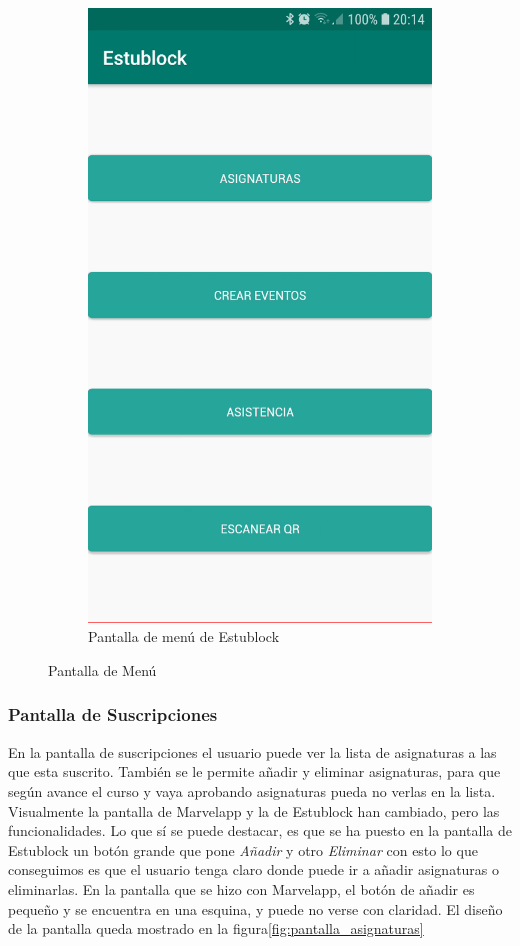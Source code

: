 \begin{figure}[hbt]
\begin{subfigure}[b]{0.4\linewidth}
        \includegraphics[width=0.7\linewidth]{figs/Desarrollo/Interfaz/estublock_menu}
        \caption[Estublock Menú]{Pantalla de menú de Estublock}
	\end{subfigure} 
	\caption[Pantalla de Menú]{Pantalla de Menú}
	\label{fig:pantalla_menu}
\end{figure}

\subsubsection{Pantalla de Suscripciones}

En la pantalla de suscripciones el usuario puede ver la lista de asignaturas a las que esta suscrito. También se le permite añadir y eliminar asignaturas, para que según avance el curso y vaya aprobando asignaturas pueda no verlas en la lista. Visualmente la pantalla de Marvelapp y la de Estublock han cambiado, pero las funcionalidades. Lo que sí se puede destacar, es que se ha puesto en la pantalla de Estublock un botón grande que pone \textit{Añadir} y otro \textit{Eliminar} con esto lo que conseguimos es que el usuario tenga claro donde puede ir a añadir asignaturas o eliminarlas. En la pantalla que se hizo con Marvelapp, el botón de añadir es pequeño y se encuentra en una esquina, y puede no verse con claridad. El diseño de la pantalla queda mostrado en la figura\ref{fig:pantalla_asignaturas}

